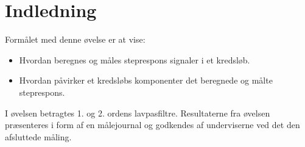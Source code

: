 \begin{comment}
Indledning
Formålet med denne øvelse er at vise:

•	Hvordan beregnes og måles steprespons signaler i et kredsløb.

•	Hvordan påvirker et kredsløbs komponenter det beregnede og målte steprespons. 

I øvelsen betragtes 1. og 2. ordens lavpasfiltre.
Resultaterne fra øvelsen præsenteres i form af en målejournal og godkendes af underviserne ved det den afsluttede måling.

*/
\end{comment}

\section{Indledning}

Formålet med denne øvelse er at vise:

\begin{itemize}

\item Hvordan beregnes og måles steprespons signaler i et kredsløb.

\item Hvordan påvirker et kredsløbs komponenter det beregnede og målte steprespons.

\end{itemize}
I øvelsen betragtes 1. og 2. ordens lavpasfiltre.
Resultaterne fra øvelsen præsenteres i form af en målejournal og godkendes af underviserne ved det den afsluttede måling. 